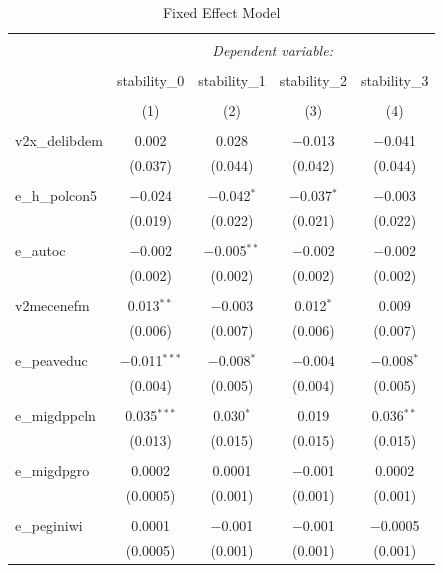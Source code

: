 \documentclass[12pt]{article}\usepackage[]{graphicx}\usepackage[]{color}
\begin{document}
\begin{table}[!htbp] \centering 
  \caption{Fixed Effect Model} 
  \label{fe} 
\begin{tabular}{@{\extracolsep{5pt}}lcccc} 
\\[-1.8ex]\hline 
\hline \\[-1.8ex] 
 & \multicolumn{4}{c}{\textit{Dependent variable:}} \\ 
\cline{2-5} 
\\[-1.8ex] & stability\_0 & stability\_1 & stability\_2 & stability\_3 \\ 
\\[-1.8ex] & (1) & (2) & (3) & (4)\\ 
\hline \\[-1.8ex] 
 v2x\_delibdem & 0.002 & 0.028 & $-$0.013 & $-$0.041 \\ 
  & (0.037) & (0.044) & (0.042) & (0.044) \\ 
  & & & & \\ 
 e\_h\_polcon5 & $-$0.024 & $-$0.042$^{*}$ & $-$0.037$^{*}$ & $-$0.003 \\ 
  & (0.019) & (0.022) & (0.021) & (0.022) \\ 
  & & & & \\ 
 e\_autoc & $-$0.002 & $-$0.005$^{**}$ & $-$0.002 & $-$0.002 \\ 
  & (0.002) & (0.002) & (0.002) & (0.002) \\ 
  & & & & \\ 
 v2mecenefm & 0.013$^{**}$ & $-$0.003 & 0.012$^{*}$ & 0.009 \\ 
  & (0.006) & (0.007) & (0.006) & (0.007) \\ 
  & & & & \\ 
 e\_peaveduc & $-$0.011$^{***}$ & $-$0.008$^{*}$ & $-$0.004 & $-$0.008$^{*}$ \\ 
  & (0.004) & (0.005) & (0.004) & (0.005) \\ 
  & & & & \\ 
 e\_migdppcln & 0.035$^{***}$ & 0.030$^{*}$ & 0.019 & 0.036$^{**}$ \\ 
  & (0.013) & (0.015) & (0.015) & (0.015) \\ 
  & & & & \\ 
 e\_migdpgro & 0.0002 & 0.0001 & $-$0.001 & 0.0002 \\ 
  & (0.0005) & (0.001) & (0.001) & (0.001) \\ 
  & & & & \\ 
 e\_peginiwi & 0.0001 & $-$0.001 & $-$0.001 & $-$0.0005 \\ 
  & (0.0005) & (0.001) & (0.001) & (0.001) \\ 

\end{tabular}
\end{table}
\end{document}
